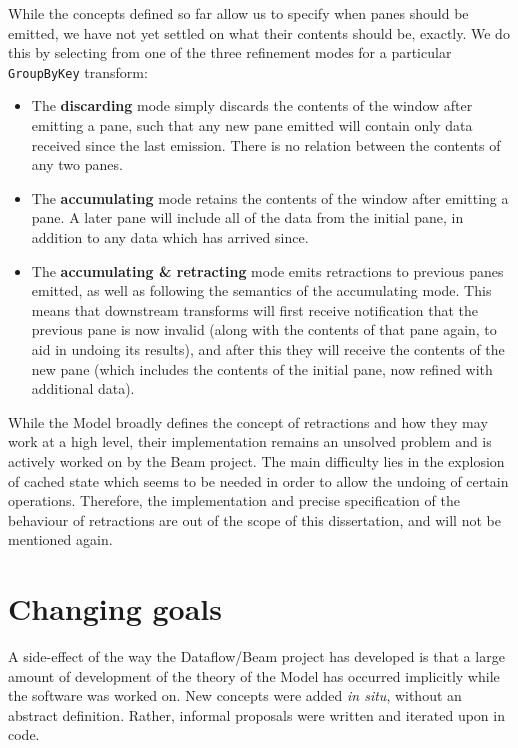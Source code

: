 While the concepts defined so far allow us to specify when panes should be emitted, we have not yet settled on what their contents should be, exactly.
We do this by selecting from one of the three refinement modes for a particular \verb|GroupByKey| transform:
\begin{itemize}
	\item The \textbf{discarding} mode simply discards the contents of the window after emitting a pane, such that any new pane emitted will contain only data received since the last emission. There is no relation between the contents of any two panes.
	\item The \textbf{accumulating} mode retains the contents of the window after emitting a pane. A later pane will include all of the data from the initial pane, in addition to any data which has arrived since.
	\item The \textbf{accumulating \& retracting} mode emits retractions to previous panes emitted, as well as following the semantics of the accumulating mode. This means that downstream transforms will first receive notification that the previous pane is now invalid (along with the contents of that pane again, to aid in undoing its results), and after this they will receive the contents of the new pane (which includes the contents of the initial pane, now refined with additional data). 
\end{itemize}


While the Model broadly defines the concept of retractions and how they may work at a high level, their implementation remains an unsolved problem and is actively worked on by the Beam project.
The main difficulty lies in the explosion of cached state which seems to be needed in order to allow the undoing of certain operations.
Therefore, the implementation and precise specification of the behaviour of retractions are out of the scope of this dissertation, and will not be mentioned again.

\section{Changing goals}

A side-effect of the way the Dataflow/Beam project has developed is that a large amount of development of the theory of the Model has occurred implicitly while the software was worked on.
New concepts were added \emph{in situ}, without an abstract definition.
Rather, informal proposals were written and iterated upon in code.

